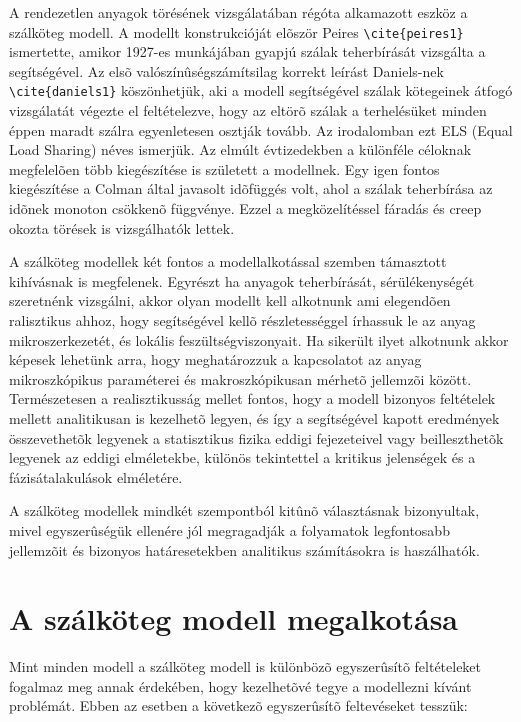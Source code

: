 \par A rendezetlen anyagok törésének vizsgálatában régóta alkamazott eszköz a
szálköteg modell. A modellt konstrukcióját elõször Peires \verb=\cite{peires1}=
ismertette, amikor 1927-es munkájában gyapjú szálak teherbírását vizsgálta a
segítségével. Az elsõ valószínûségszámítsilag korrekt leírást Daniels-nek
\verb=\cite{daniels1}= köszönhetjük, aki a modell segítségével szálak kötegeinek
átfogó vizsgálatát végezte el feltételezve, hogy az eltörõ szálak a
terhelésüket minden éppen maradt szálra egyenletesen osztják tovább. Az
irodalomban ezt ELS (Equal Load Sharing) néves ismerjük. Az elmúlt évtizedekben
a különféle céloknak megfelelõen több kiegészítése is született a modellnek.
Egy igen fontos kiegészítése a Colman által javasolt idõfüggés volt, ahol a
szálak teherbírása az idõnek monoton csökkenõ függvénye. Ezzel a megközelítéssel
fáradás és creep okozta törések is vizsgálhatók lettek.
\par A szálköteg modellek két fontos a modellalkotással szemben támasztott
kihívásnak is megfelenek. Egyrészt ha anyagok teherbírását, sérülékenységét
szeretnénk vizsgálni, akkor olyan modellt kell alkotnunk ami elegendõen
ralisztikus ahhoz, hogy segítségével kellõ részletességgel írhassuk le
az anyag mikroszerkezetét, és lokális feszültségviszonyait. Ha sikerült ilyet
alkotnunk akkor képesek lehetünk arra, hogy meghatározzuk a kapcsolatot
az anyag mikroszkópikus paraméterei és makroszkópikusan mérhetõ
jellemzõi között. Természetesen a realisztikusság mellet fontos, hogy a
modell bizonyos feltételek mellett analitikusan is kezelhetõ legyen, és így a 
segítségével kapott eredmények összevethetõk legyenek a
statisztikus fizika eddigi fejezeteivel vagy beilleszthetõk legyenek az
eddigi elméletekbe, különös tekintettel a kritikus
jelenségek és a fázisátalakulások elméletére. 
\par A szálköteg modellek mindkét 
szempontból kitûnõ választásnak bizonyultak, mivel egyszerûségük ellenére
jól megragadják a folyamatok legfontosabb jellemzõit és bizonyos határesetekben
analitikus számításokra is haszálhatók.

\section{A szálköteg modell megalkotása}
\par Mint minden modell a szálköteg modell is különbözõ egyszerûsítõ
feltételeket fogalmaz meg annak érdekében, hogy kezelhetõvé tegye a modellezni kívánt
problémát. Ebben az esetben a következõ egyszerûsítõ feltevéseket tesszük:
